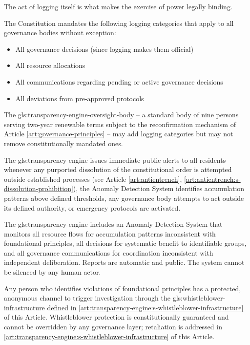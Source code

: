 The act of logging itself is what makes the exercise of power legally binding.

The Constitution mandates the following logging categories that apply to all governance bodies without exception:
\begin{itemize}
  \item All governance decisions (since logging makes them official)
  \item All resource allocations
  \item All communications regarding pending or active governance decisions
  \item All deviations from pre-approved protocols
\end{itemize}

The \gls{gls:transparency-engine-oversight-body} -- a standard body of nine persons serving two-year renewable terms subject to the reconfirmation mechanism of Article \ref{art:governance-principles} -- may add logging categories but may not remove constitutionally mandated ones.

The \gls{gls:transparency-engine} issues immediate public alerts to all residents whenever any purported dissolution of the constitutional order is attempted outside established processes (see Article \ref{art:antientrench}, \ref{art:antientrench:s-dissolution-prohibition}), the Anomaly Detection System identifies accumulation patterns above defined thresholds, any governance body attempts to act outside its defined authority, or emergency protocols are activated.

The \gls{gls:transparency-engine} includes an Anomaly Detection System that monitors all resource flows for accumulation patterns inconsistent with foundational principles, all decisions for systematic benefit to identifiable groups, and all governance communications for coordination inconsistent with independent deliberation. Reports are automatic and public. The system cannot be silenced by any human actor.

Any person who identifies violations of foundational principles has a protected, anonymous channel to trigger investigation through the \gls{gls:whistleblower-infrastructure} defined in \ref{art:transparency-engine:s-whistleblower-infrastructure} of this Article. Whistleblower protection is constitutionally guaranteed and cannot be overridden by any governance layer; retaliation is addressed in \ref{art:transparency-engine:s-whistleblower-infrastructure} of this Article.

